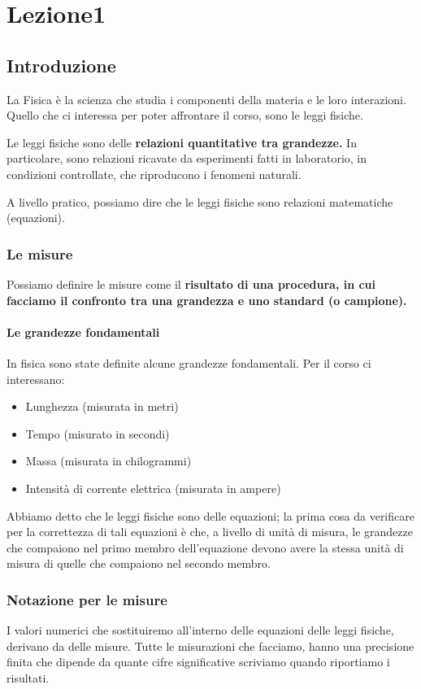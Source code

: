 \chapter{Lezione1}

\section{Introduzione}
La Fisica è la  scienza che studia i componenti della materia e le loro interazioni. Quello che ci interessa per poter affrontare il corso, sono le leggi fisiche.

Le leggi fisiche sono delle \textbf{relazioni quantitative tra grandezze.} In particolare, sono relazioni ricavate da esperimenti fatti  in laboratorio,  in  condizioni controllate, che riproducono i fenomeni naturali.

A livello pratico,  possiamo dire che le leggi fisiche sono relazioni matematiche (equazioni).

\subsection{Le misure}
Possiamo definire le misure come il \textbf{risultato di una procedura, in cui facciamo il confronto tra una grandezza e uno standard (o campione).}

\subsubsection{Le grandezze fondamentali}
In fisica sono state definite alcune grandezze fondamentali.  Per il corso ci interessano:
\begin{itemize}
	\item Lunghezza (misurata in metri)
	\item Tempo (misurato in secondi)
	\item Massa (misurata in chilogrammi)
	\item Intensità di corrente elettrica (misurata in ampere)
\end{itemize}

Abbiamo detto che le leggi fisiche sono delle equazioni; la prima cosa da verificare per la correttezza di tali equazioni è che,  a livello di unità di misura,  le grandezze che compaiono nel primo membro dell'equazione devono avere la stessa unità di misura di quelle che compaiono nel secondo membro. 

\subsection{Notazione per le misure}
I valori numerici che sostituiremo all'interno delle equazioni delle leggi fisiche, derivano da delle misure.  Tutte le misurazioni che facciamo,  hanno una precisione finita che dipende da quante cifre significative scriviamo quando riportiamo i risultati.

